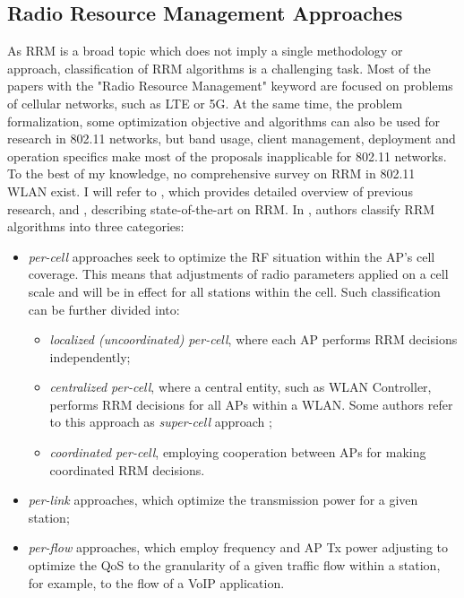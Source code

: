 \subsection {Radio Resource Management Approaches}
\label{chap:lr:sec:rrm_approaches}
As RRM is a broad topic which does not imply a single methodology or approach, classification of RRM algorithms is a challenging task. Most of the papers with the "Radio Resource Management" keyword are focused on problems of cellular networks, such as LTE or 5G. At the same time, the problem formalization, some optimization objective and algorithms can also be used for research in 802.11 networks, but band usage, client management, deployment and operation specifics make most of the proposals inapplicable for 802.11 networks.
To the best of my knowledge, no comprehensive survey on RRM in 802.11 WLAN exist. I will refer to \cite{bouhafsPerFlowRadioResource2020}, which provides detailed overview of previous research, and \cite{leeDeepLearningAidedChannel2023}, describing state-of-the-art on RRM.
In \cite{bouhafsPerFlowRadioResource2020}, authors classify RRM algorithms into three categories:
\begin{itemize}
    \item \textit{per-cell} approaches seek to optimize the RF situation within the AP's cell coverage. This means that adjustments of radio parameters applied on a cell scale and will be in effect for all stations within the cell. Such classification can be further divided into:
    \begin{itemize}
        \item \textit{localized (uncoordinated) per-cell}, where each AP performs RRM decisions independently;
        \item \textit{centralized per-cell}, where a central entity, such as WLAN Controller, performs RRM decisions for all APs within a WLAN. Some authors refer to this approach as \textit{super-cell} approach \cite{levantiCAPWAPCompliantSolutionRadio2007}; \item \textit{coordinated per-cell}, employing cooperation between APs for making coordinated RRM decisions.  \end{itemize} \item \textit{per-link} approaches, which optimize the transmission power for a given station; \item \textit{per-flow} approaches, which employ frequency and AP Tx power adjusting to optimize the QoS to the granularity of a given traffic flow within a station, for example, to the flow of a VoIP application.
\end{itemize}

